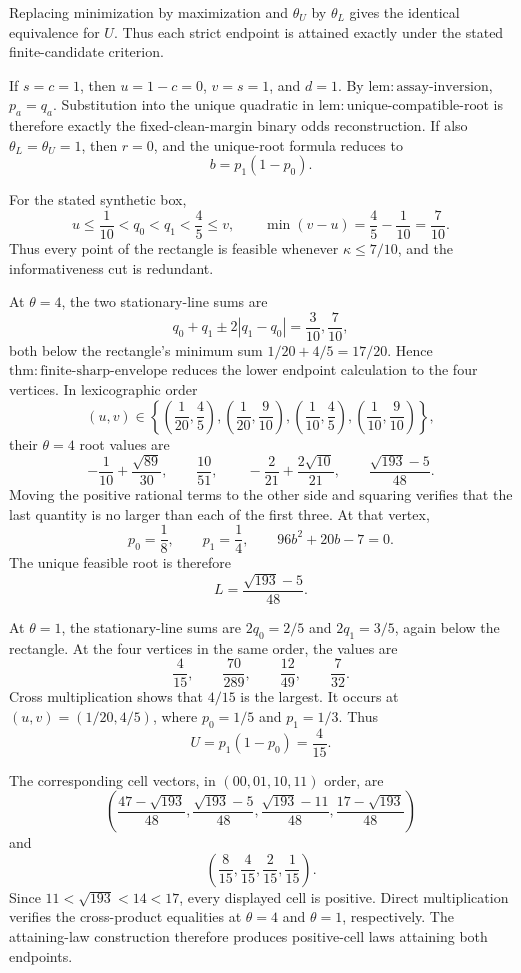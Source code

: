 Replacing minimization by maximization and \(\theta_U\) by \(\theta_L\) gives the identical equivalence for \(U\). Thus each strict endpoint is attained exactly under the stated finite-candidate criterion.

If \(s=c=1\), then \(u=1-c=0\), \(v=s=1\), and \(d=1\). By \(\mathrm{lem:assay\text{-}inversion}\), \(p_a=q_a\). Substitution into the unique quadratic in \(\mathrm{lem:unique\text{-}compatible\text{-}root}\) is therefore exactly the fixed-clean-margin binary odds reconstruction. If also \(\theta_L=\theta_U=1\), then \(r=0\), and the unique-root formula reduces to
\[
b=p_1(1-p_0).
\]

For the stated synthetic box,
\[
u\leq\frac1{10}<q_0<q_1<\frac45\leq v,
\qquad
\min(v-u)=\frac45-\frac1{10}=\frac7{10}.
\]
Thus every point of the rectangle is feasible whenever \(\kappa\leq7/10\), and the informativeness cut is redundant.

At \(\theta=4\), the two stationary-line sums are
\[
q_0+q_1\pm2|q_1-q_0|
=\frac3{10},\frac7{10},
\]
both below the rectangle's minimum sum \(1/20+4/5=17/20\). Hence \(\mathrm{thm:finite\text{-}sharp\text{-}envelope}\) reduces the lower endpoint calculation to the four vertices. In lexicographic order
\[
(u,v)\in
\left\{
\left(\frac1{20},\frac45\right),
\left(\frac1{20},\frac9{10}\right),
\left(\frac1{10},\frac45\right),
\left(\frac1{10},\frac9{10}\right)
\right\},
\]
their \(\theta=4\) root values are
\[
-\frac1{10}+\frac{\sqrt{89}}{30},
\qquad
\frac{10}{51},
\qquad
-\frac2{21}+\frac{2\sqrt{10}}{21},
\qquad
\frac{\sqrt{193}-5}{48}.
\]
Moving the positive rational terms to the other side and squaring verifies that the last quantity is no larger than each of the first three. At that vertex,
\[
p_0=\frac18,
\qquad
p_1=\frac14,
\qquad
96b^2+20b-7=0.
\]
The unique feasible root is therefore
\[
L=\frac{\sqrt{193}-5}{48}.
\]

At \(\theta=1\), the stationary-line sums are \(2q_0=2/5\) and \(2q_1=3/5\), again below the rectangle. At the four vertices in the same order, the values are
\[
\frac4{15},
\qquad
\frac{70}{289},
\qquad
\frac{12}{49},
\qquad
\frac7{32}.
\]
Cross multiplication shows that \(4/15\) is the largest. It occurs at \((u,v)=(1/20,4/5)\), where \(p_0=1/5\) and \(p_1=1/3\). Thus
\[
U=p_1(1-p_0)=\frac4{15}.
\]

The corresponding cell vectors, in \((00,01,10,11)\) order, are
\[
\left(
\frac{47-\sqrt{193}}{48},
\frac{\sqrt{193}-5}{48},
\frac{\sqrt{193}-11}{48},
\frac{17-\sqrt{193}}{48}
\right)
\]
and
\[
\left(\frac8{15},\frac4{15},\frac2{15},\frac1{15}\right).
\]
Since \(11<\sqrt{193}<14<17\), every displayed cell is positive. Direct multiplication verifies the cross-product equalities at \(\theta=4\) and \(\theta=1\), respectively. The attaining-law construction therefore produces positive-cell laws attaining both endpoints.

